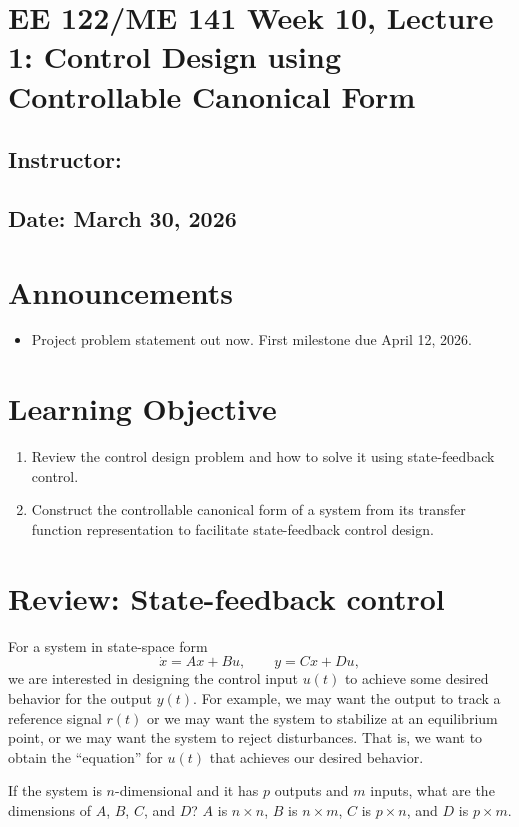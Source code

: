 \documentclass{ee122_notes}
\renewcommand{\releasedate}{March 30, 2026}
\begin{document}
\section*{EE 122/ME 141 Week 10, Lecture 1: Control Design using Controllable Canonical Form}
\subsection*{Instructor: \instructor}
\subsection*{Date: \releasedate}
\section{Announcements}
\begin{itemize}
    \item Project problem statement out now. First milestone due April 12, 2026.
\end{itemize}
\section{Learning Objective}
\begin{enumerate}
\item Review the control design problem and how to solve it using state-feedback control. 
\item Construct the controllable canonical form of a system from its transfer function representation to facilitate state-feedback control design.
\end{enumerate} 

\section{Review: State-feedback control}
For a system in state-space form
\[
\dot{x}=Ax+Bu, \qquad y=Cx+Du,
\]
we are interested in designing the control input \(u(t)\) to achieve some desired behavior for the output \(y(t)\). For example, we may want the output to track a reference signal \(r(t)\) or we may want the system to stabilize at an equilibrium point, or we may want the system to reject disturbances. That is, we want to obtain the ``equation'' for \(u(t)\) that achieves our desired behavior.

\begin{popquiz}
    If the system is $n$-dimensional and it has $p$ outputs and $m$ inputs, what are the dimensions of $A$, $B$, $C$, and $D$?
    \popqsplit
    $A$ is $n \times n$, $B$ is $n \times m$, $C$ is $p \times n$, and $D$ is $p \times m$. 
\end{popquiz}
\end{document}
